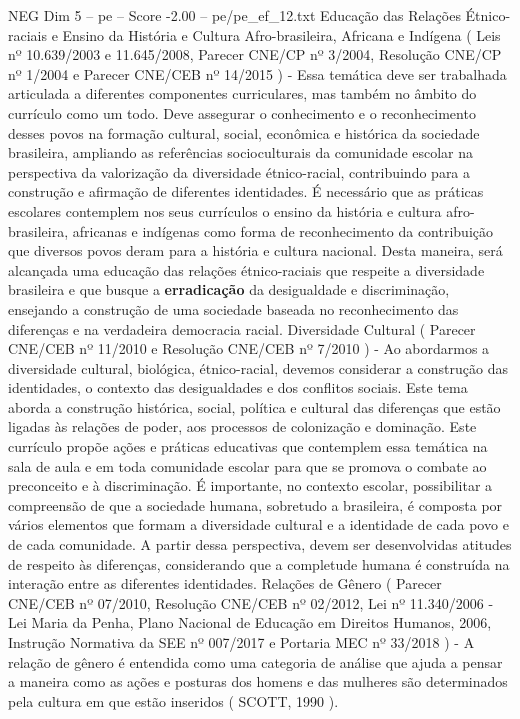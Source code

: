 \begin{textsample}{NEG Dim 5 – pe – Score -2.00 – pe/pe\_ef\_12.txt}
Educação das Relações Étnico-raciais e Ensino da História e Cultura Afro-brasileira, Africana e Indígena ( Leis nº 10.639/2003 e 11.645/2008, Parecer CNE/CP nº 3/2004, Resolução CNE/CP nº 1/2004 e Parecer CNE/CEB nº 14/2015 ) - Essa temática deve ser trabalhada articulada a diferentes componentes curriculares, mas também no âmbito do currículo como um todo.
Deve assegurar o conhecimento e o reconhecimento desses povos na formação cultural, social, econômica e histórica da sociedade brasileira, ampliando as referências socioculturais da comunidade escolar na perspectiva da valorização da diversidade étnico-racial, contribuindo para a construção e afirmação de diferentes identidades.
É necessário que as práticas escolares contemplem nos seus currículos o ensino da história e cultura afro-brasileira, africanas e indígenas como forma de reconhecimento da contribuição que diversos povos deram para a história e cultura nacional.
Desta maneira, será alcançada uma educação das relações étnico-raciais que respeite a diversidade brasileira e que busque a \textbf{erradicação} da desigualdade e discriminação, ensejando a construção de uma sociedade baseada no reconhecimento das diferenças e na verdadeira democracia racial.
Diversidade Cultural ( Parecer CNE/CEB nº 11/2010 e Resolução CNE/CEB nº 7/2010 ) - Ao abordarmos a diversidade cultural, biológica, étnico-racial, devemos considerar a construção das identidades, o contexto das desigualdades e dos conflitos sociais.
Este tema aborda a construção histórica, social, política e cultural das diferenças que estão ligadas às relações de poder, aos processos de colonização e dominação.
Este currículo propõe ações e práticas educativas que contemplem essa temática na sala de aula e em toda comunidade escolar para que se promova o combate ao preconceito e à discriminação.
É importante, no contexto escolar, possibilitar a compreensão de que a sociedade humana, sobretudo a brasileira, é composta por vários elementos que formam a diversidade cultural e a identidade de cada povo e de cada comunidade.
A partir dessa perspectiva, devem ser desenvolvidas atitudes de respeito às diferenças, considerando que a completude humana é construída na interação entre as diferentes identidades.
Relações de Gênero ( Parecer CNE/CEB nº 07/2010, Resolução CNE/CEB nº 02/2012, Lei nº 11.340/2006 - Lei Maria da Penha, Plano Nacional de Educação em Direitos Humanos, 2006, Instrução Normativa da SEE nº 007/2017 e Portaria MEC nº 33/2018 ) - A relação de gênero é entendida como uma categoria de análise que ajuda a pensar a maneira como as ações e posturas dos homens e das mulheres são determinados pela cultura em que estão inseridos ( SCOTT, 1990 ).

\end{textsample}
